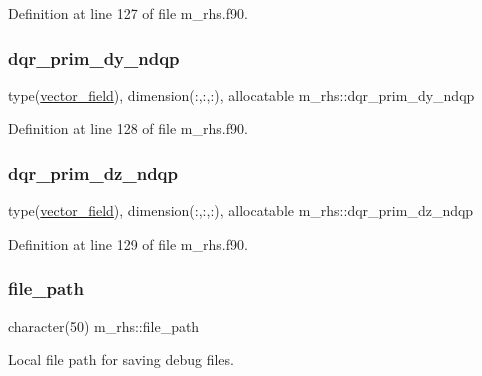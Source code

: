Definition at line 127 of file m\+\_\+rhs.\+f90.

\mbox{\label{namespacem__rhs_a40f05825c656c34602ba19e320537359}} 
\subsubsection{\texorpdfstring{dqr\+\_\+prim\+\_\+dy\+\_\+ndqp}{dqr\_prim\_dy\_ndqp}}
{\footnotesize\ttfamily type(\hyperlink{structm__derived__types_1_1vector__field}{vector\+\_\+field}), dimension(\+:,\+:,\+:), allocatable m\+\_\+rhs\+::dqr\+\_\+prim\+\_\+dy\+\_\+ndqp}



Definition at line 128 of file m\+\_\+rhs.\+f90.

\mbox{\label{namespacem__rhs_a9cf1c914824cb4cc3476416da9be78f4}} 
\subsubsection{\texorpdfstring{dqr\+\_\+prim\+\_\+dz\+\_\+ndqp}{dqr\_prim\_dz\_ndqp}}
{\footnotesize\ttfamily type(\hyperlink{structm__derived__types_1_1vector__field}{vector\+\_\+field}), dimension(\+:,\+:,\+:), allocatable m\+\_\+rhs\+::dqr\+\_\+prim\+\_\+dz\+\_\+ndqp}



Definition at line 129 of file m\+\_\+rhs.\+f90.

\mbox{\label{namespacem__rhs_a31f27cef4252ee5a36802fd02b3f8ac9}} 
\subsubsection{\texorpdfstring{file\+\_\+path}{file\_path}}
{\footnotesize\ttfamily character(50) m\+\_\+rhs\+::file\+\_\+path}



Local file path for saving debug files. 



